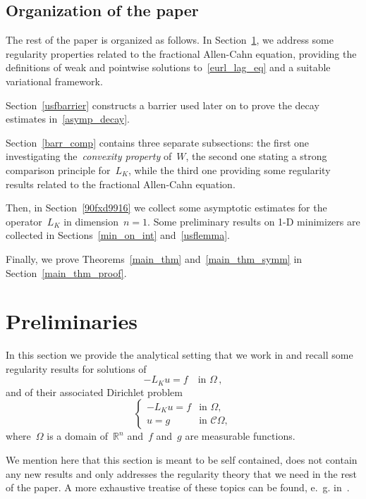 \documentclass[10pt,a4paper]{amsart}
\numberwithin{equation}{section}
\newcommand{\R}{\mathbb{R}}
\begin{document}
\subsection{Organization of the paper}
The rest of the paper is organized as follows. In Section~\ref{prel}, we address some regularity properties related to the fractional Allen-Cahn equation, providing the definitions of weak and pointwise solutions to~\eqref{eurl_lag_eq} and a suitable variational framework.

Section~\ref{usfbarrier} constructs a barrier used later on to prove the decay estimates in~\eqref{asymp_decay}. 

Section~\ref{barr_comp} contains three separate subsections: the first one investigating the~\textit{convexity property} of~$W$, the second one stating a strong comparison principle for~${L}_K$, while the third one providing some regularity results related to the fractional Allen-Cahn equation. 

Then, in Section~\ref{90fxd9916} we collect some asymptotic estimates for the operator~${L}_K$ in dimension~$n=1$.
Some preliminary results on 1-D minimizers are collected in Sections~\ref{min_on_int} and~\ref{usflemma}.

Finally, we prove Theorems~\ref{main_thm} and~\ref{main_thm_symm} in Section~\ref{main_thm_proof}.

     \section{Preliminaries}\label{prel}
In this section we 
provide the analytical setting that we work in and recall some
regularity results for solutions of 
     \begin{equation}\label{nonloc_eq}
         -{L}_K u =f \quad \mbox{in } \Omega\,,
     \end{equation}
    and of their associated Dirichlet problem
    \begin{equation}\label{dirichlet_pbm}
        \begin{cases}
            -{L}_K u = f & \mbox{in }  \Omega,\\
             u = g & \mbox{in } \mathscr{C}\Omega,
        \end{cases}
    \end{equation}
    where~$\Omega$ is a domain of~$\R^n$ and~$f$ and~$g$ are measurable functions. 
    
    We mention here that this section is meant to be self contained, does not contain any new results and only addresses the regularity theory that we need in the rest of the paper. A more exhaustive treatise of these topics can be found, e.~\!g. in~\cite{CS09,CS11,CP16,Ros16,RS14,Sil06}.
    
\end{document}
